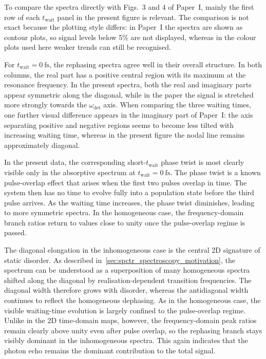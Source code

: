 To compare the spectra directly with Figs.~3 and 4 of Paper~I, mainly the first row of each $t_{\mathrm{wait}}$ panel in the present figure is relevant. The comparison is not exact because the plotting style differs: in Paper~I the spectra are shown as contour plots, so signal levels below 5\% are not displayed, whereas in the colour plots used here weaker trends can still be recognised.

For $t_{\mathrm{wait}}=\SI{0}{\femto\second}$, the rephasing spectra agree well in their overall structure. In both columns, the real part has a positive central region with its maximum at the resonance frequency. In the present spectra, both the real and imaginary parts appear symmetric along the diagonal, while in the paper the signal is stretched more strongly towards the $\omega_{\mathrm{det}}$ axis. When comparing the three waiting times, one further visual difference appears in the imaginary part of Paper~I: the axis separating positive and negative regions seems to become less tilted with increasing waiting time, whereas in the present figure the nodal line remains approximately diagonal.

In the present data, the corresponding short-$t_{\mathrm{wait}}$ phase twist is most clearly visible only in the absorptive spectrum at $t_{\mathrm{wait}}=\SI{0}{\femto\second}$. The phase twist is a known pulse-overlap effect that arises when the first two pulses overlap in time. The system then has no time to evolve fully into a population state before the third pulse arrives. As the waiting time increases, the phase twist diminishes, leading to more symmetric spectra. In the homogeneous case, the frequency-domain branch ratios return to values close to unity once the pulse-overlap regime is passed.

The diagonal elongation in the inhomogeneous case is the central 2D signature of static disorder. As described in~\autoref{sec:spctr_spectroscopy_motivation}, the spectrum can be understood as a superposition of many homogeneous spectra shifted along the diagonal by realisation-dependent transition frequencies. The diagonal width therefore grows with disorder, whereas the antidiagonal width continues to reflect the homogeneous dephasing. As in the homogeneous case, the visible waiting-time evolution is largely confined to the pulse-overlap regime. Unlike in the 2D time-domain maps, however, the frequency-domain peak ratios remain clearly above unity even after pulse overlap, so the rephasing branch stays visibly dominant in the inhomogeneous spectra. This again indicates that the photon echo remains the dominant contribution to the total signal.

